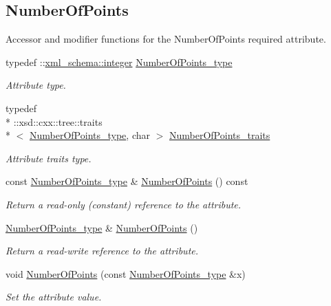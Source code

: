 \subsection*{Number\-Of\-Points}
\label{_amgrp38600d7fb1ccb3e7ee12b901540b4f7d}%
Accessor and modifier functions for the Number\-Of\-Points required attribute. \begin{DoxyCompactItemize}
\item 
typedef \-::\hyperlink{namespacexml__schema_aaaea7c8ce4dfbe26cc52c91c29c97b7c}{xml\-\_\-schema\-::integer} \hyperlink{classPieceUnstructuredGrid__t_a8df1cd0d138d990e166d325ceed9a660}{Number\-Of\-Points\-\_\-type}
\begin{DoxyCompactList}\small\item\em Attribute type. \end{DoxyCompactList}\item 
typedef \\*
\-::xsd\-::cxx\-::tree\-::traits\\*
$<$ \hyperlink{classPieceUnstructuredGrid__t_a8df1cd0d138d990e166d325ceed9a660}{Number\-Of\-Points\-\_\-type}, char $>$ \hyperlink{classPieceUnstructuredGrid__t_acdfbb1dc264a5a48bcc6d4aa815db003}{Number\-Of\-Points\-\_\-traits}
\begin{DoxyCompactList}\small\item\em Attribute traits type. \end{DoxyCompactList}\item 
const \hyperlink{classPieceUnstructuredGrid__t_a8df1cd0d138d990e166d325ceed9a660}{Number\-Of\-Points\-\_\-type} \& \hyperlink{classPieceUnstructuredGrid__t_a6fe4a92f59d9a837e046bf3d51e79b33}{Number\-Of\-Points} () const 
\begin{DoxyCompactList}\small\item\em Return a read-\/only (constant) reference to the attribute. \end{DoxyCompactList}\item 
\hyperlink{classPieceUnstructuredGrid__t_a8df1cd0d138d990e166d325ceed9a660}{Number\-Of\-Points\-\_\-type} \& \hyperlink{classPieceUnstructuredGrid__t_adadae535c3c291dc01dd0be3315d9dbc}{Number\-Of\-Points} ()
\begin{DoxyCompactList}\small\item\em Return a read-\/write reference to the attribute. \end{DoxyCompactList}\item 
void \hyperlink{classPieceUnstructuredGrid__t_a3e4e5defa42f9ecebb2016ca1d207700}{Number\-Of\-Points} (const \hyperlink{classPieceUnstructuredGrid__t_a8df1cd0d138d990e166d325ceed9a660}{Number\-Of\-Points\-\_\-type} \&x)
\begin{DoxyCompactList}\small\item\em Set the attribute value. \end{DoxyCompactList}\end{DoxyCompactItemize}
